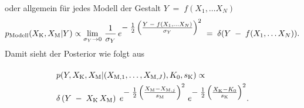 \begin{enumerate}
oder allgemein für jedes Modell der Gestalt $Y \; = \; f(X_1, \dots X_N)$
\begin{equation}
p_\mathrm{Modell} (X_\mathrm{K}, X_\mathrm{M} | Y) \propto
\lim\limits_{\sigma_Y \rightarrow 0}  \, \frac{1}{\sigma_Y} \,
e^{\textstyle-\;\frac{1}{2} \left(\frac{ Y \; - \; f(X_1, \dots X_N)}{\sigma_Y} \right)^2} \; = \;
\delta(Y \; - \; f(X_1, \dots X_N) ) .
\label{pdfallgemeinesModellDiracPeak}
\end{equation}
	Damit sieht der Posterior wie folgt aus
\begin{equation}
\arraycolsep=2.0pt\def\arraystretch{2.0}
\begin{array}{l}
p(Y, X_\mathrm{K}, X_\mathrm{M} | (X_{\mathrm{M},1}, \dots, X_{\mathrm{M},J}), K_0, s_\mathrm{K}) \propto \\
\delta \left( Y \; - \; X_\mathrm{K} \, X_\mathrm{M}\right)
\; e^{\T-\;\frac{1}{2} \left(\frac{ X_\mathrm{M} - X_{\mathrm{M},j} }{s_\mathrm{M}} \right)^2}
\;  e^{\T-\;\frac{1}{2} \left(\frac{X_\mathrm{K} - K_0}{s_\mathrm{K}} \right)^2}.
\end{array}
\label{PosteriorFall4}
\end{equation}
\end{enumerate}

